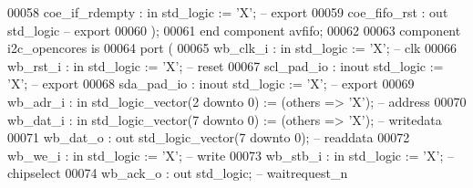 \begin{DoxyCode}
00058             coe_if_rdempty : \textcolor{keywordflow}{in}  \textcolor{comment}{std\_logic}                     := 'X';             \textcolor{keyword}{-- export}
00059             coe_fifo_rst   : \textcolor{keywordflow}{out} \textcolor{comment}{std\_logic}\textcolor{keyword}{                                         -- export}
00060         );
00061     \textcolor{keywordflow}{end} \textcolor{keywordflow}{component} \textcolor{vhdlchar}{avfifo};
00062 
00063     \textcolor{keywordflow}{component} i2c\_opencores \textcolor{keywordflow}{is}
00064         \textcolor{keywordflow}{port} (
00065             wb\_clk\_i   : \textcolor{keywordflow}{in}    \textcolor{comment}{std\_logic}                    := 'X';             \textcolor{keyword}{-- clk}
00066             wb\_rst\_i   : \textcolor{keywordflow}{in}    \textcolor{comment}{std\_logic}                    := 'X';             \textcolor{keyword}{-- reset}
00067             scl\_pad\_io : \textcolor{keywordflow}{inout} \textcolor{comment}{std\_logic}                    := 'X';             \textcolor{keyword}{-- export}
00068             sda\_pad\_io : \textcolor{keywordflow}{inout} \textcolor{comment}{std\_logic}                    := 'X';             \textcolor{keyword}{-- export}
00069             wb\_adr\_i   : \textcolor{keywordflow}{in}    \textcolor{comment}{std\_logic\_vector}(\textcolor{vhdllogic}{}\textcolor{vhdllogic}{2} \textcolor{keywordflow}{downto} \textcolor{vhdllogic}{}\textcolor{vhdllogic}{0}) := (\textcolor{keywordflow}{others} => 'X'); \textcolor{keyword}{-- address}
00070             wb\_dat\_i   : \textcolor{keywordflow}{in}    \textcolor{comment}{std\_logic\_vector}(\textcolor{vhdllogic}{}\textcolor{vhdllogic}{7} \textcolor{keywordflow}{downto} \textcolor{vhdllogic}{}\textcolor{vhdllogic}{0}) := (\textcolor{keywordflow}{others} => 'X'); \textcolor{keyword}{-- writedata}
00071             wb\_dat\_o   : \textcolor{keywordflow}{out}   \textcolor{comment}{std\_logic\_vector}(\textcolor{vhdllogic}{}\textcolor{vhdllogic}{7} \textcolor{keywordflow}{downto} \textcolor{vhdllogic}{}\textcolor{vhdllogic}{0});                    \textcolor{keyword}{-- readdata}
00072             wb\_we\_i    : \textcolor{keywordflow}{in}    \textcolor{comment}{std\_logic}                    := 'X';             \textcolor{keyword}{-- write}
00073             wb\_stb\_i   : \textcolor{keywordflow}{in}    \textcolor{comment}{std\_logic}                    := 'X';             \textcolor{keyword}{-- chipselect}
00074             wb\_ack\_o   : \textcolor{keywordflow}{out}   \textcolor{comment}{std\_logic};                                       \textcolor{keyword}{-- waitrequest\_n}

\end{DoxyCode}
